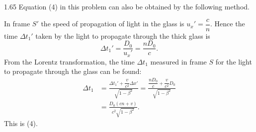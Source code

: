 \begin{solution}{1.65}
Equation (4) in this problem can also be obtained by the following method.

In frame $S'$ the speed of propagation of light in the glass is $u_x'=\dfrac{c}{n}$. Hence the time $\Delta t_1'$ taken by the light to propagate through the thick glass is
\[
\Delta t_1'=\frac{D_0}{u_x'}=\frac{nD_0}{c}.
\]
From the Lorentz transformation, the time $\Delta t_1$ measured in frame $S$ for the light to propagate through the glass can be found:
\[
\begin{aligned}
\Delta t_1&=\frac{\Delta t_1'+\dfrac{v}{c^2}\Delta x'}{\sqrt{1-\beta^2}}
=\frac{\dfrac{nD_0}{c}+\dfrac{v}{c^2}D_0}{\sqrt{1-\beta^2}}\\
&=\frac{D_0(cn+v)}{c^2\sqrt{1-\beta^2}} .
\end{aligned}
\]
This is (4).
\end{solution}

